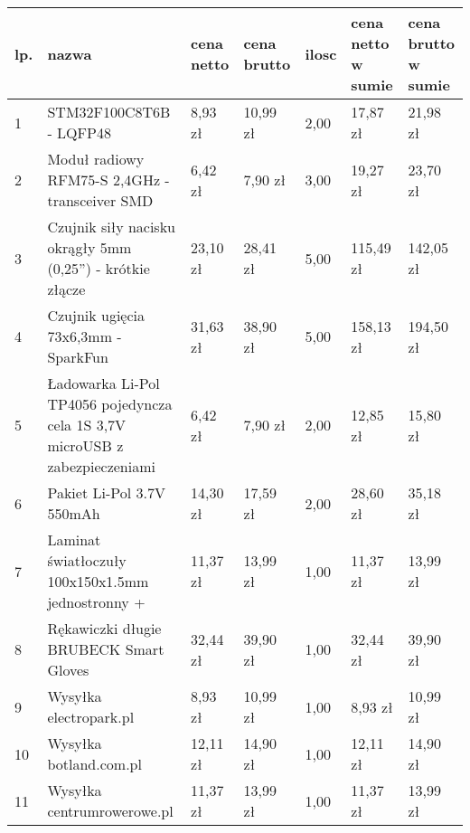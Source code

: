 \begin{table}[h]
\centering
\label{Budżet}
\begin{tabular}{|l|p{6cm}|l|l|l|l|l|}
\hline 
lp. & nazwa                                                               & cena netto & cena brutto & ilosc & cena netto w sumie & cena brutto w sumie \\ \hline
1   & STM32F100C8T6B - LQFP48                                                     & 8,93  zł   & 10,99  zł   & 2,00  & 17,87  zł          & 21,98  zł           \\ \hline
2   & Moduł radiowy RFM75-S 2,4GHz - transceiver SMD                              & 6,42  zł   & 7,90  zł    & 3,00  & 19,27  zł          & 23,70  zł           \\ \hline
3   & Czujnik siły nacisku okrągły 5mm (0,25'') - krótkie złącze                  & 23,10  zł  & 28,41  zł   & 5,00  & 115,49  zł         & 142,05  zł          \\ \hline
4   & Czujnik ugięcia 73x6,3mm - SparkFun                                         & 31,63  zł  & 38,90  zł   & 5,00  & 158,13  zł         & 194,50  zł          \\ \hline
5   & Ładowarka Li-Pol TP4056 pojedyncza cela 1S 3,7V microUSB z zabezpieczeniami & 6,42  zł   & 7,90  zł    & 2,00  & 12,85  zł          & 15,80  zł           \\ \hline
6   & Pakiet Li-Pol 3.7V 550mAh                                                   & 14,30  zł  & 17,59  zł   & 2,00  & 28,60  zł          & 35,18  zł           \\ \hline
7   & Laminat światłoczuły 100x150x1.5mm jednostronny +                           & 11,37  zł  & 13,99  zł   & 1,00  & 11,37  zł          & 13,99  zł           \\ \hline
8   & Rękawiczki długie BRUBECK Smart Gloves                                      & 32,44  zł  & 39,90  zł   & 1,00  & 32,44  zł          & 39,90  zł           \\ \hline
9   & Wysyłka electropark.pl                                                      & 8,93  zł   & 10,99  zł   & 1,00  & 8,93  zł           & 10,99  zł           \\ \hline
10  & Wysyłka botland.com.pl                                                      & 12,11  zł  & 14,90  zł   & 1,00  & 12,11  zł          & 14,90  zł           \\ \hline
11  & Wysyłka centrumrowerowe.pl                                                  & 11,37  zł  & 13,99  zł   & 1,00  & 11,37  zł          & 13,99  zł  \\ \hline        
\end{tabular}
\end{table}